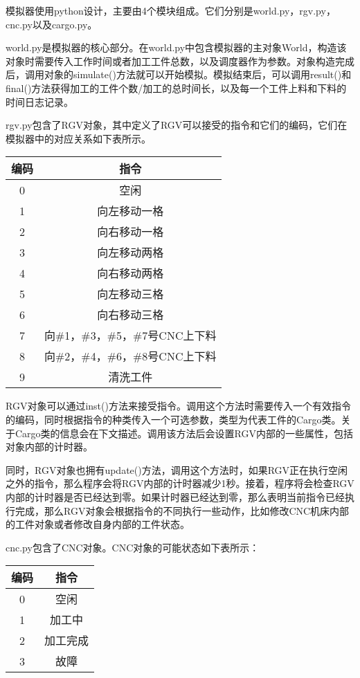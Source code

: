 \documentclass{cumcmthesis}
\begin{document}
模拟器使用python设计，主要由4个模块组成。它们分别是world.py，rgv.py，cnc.py以及cargo.py。

world.py是模拟器的核心部分。在world.py中包含模拟器的主对象World，构造该对象时需要传入工作时间或者加工工件总数，以及调度器作为参数。对象构造完成后，调用对象的simulate()方法就可以开始模拟。模拟结束后，可以调用result()和final()方法获得加工的工件个数/加工的总时间长，以及每一个工件上料和下料的时间日志记录。

rgv.py包含了RGV对象，其中定义了RGV可以接受的指令和它们的编码，它们在模拟器中的对应关系如下表所示。

\begin{tabular}{c|c}
	\hline
	编码 & 指令 \\
	\hline
	0 & 空闲 \\
	1 & 向左移动一格\\
	2 & 向右移动一格\\
	3 & 向左移动两格\\
	4 & 向右移动两格\\
	5 & 向左移动三格\\
	6 & 向右移动三格\\
	7 & 向\#1，\#3，\#5，\#7号CNC上下料\\
	8 & 向\#2，\#4，\#6，\#8号CNC上下料\\
	9 & 清洗工件\\
	\hline
\end{tabular}

RGV对象可以通过inst()方法来接受指令。调用这个方法时需要传入一个有效指令的编码，同时根据指令的种类传入一个可选参数，类型为代表工件的Cargo类。关于Cargo类的信息会在下文描述。调用该方法后会设置RGV内部的一些属性，包括对象内部的计时器。

同时，RGV对象也拥有update()方法，调用这个方法时，如果RGV正在执行空闲之外的指令，那么程序会将RGV内部的计时器减少1秒。接着，程序将会检查RGV内部的计时器是否已经达到零。如果计时器已经达到零，那么表明当前指令已经执行完成，那么RGV对象会根据指令的不同执行一些动作，比如修改CNC机床内部的工件对象或者修改自身内部的工件状态。

cnc.py包含了CNC对象。CNC对象的可能状态如下表所示：

\begin{tabular}{c|c}
	\hline
	编码 & 指令 \\
	\hline
	0 & 空闲 \\
	1 & 加工中\\
	2 & 加工完成\\
	3 & 故障\\
	\hline
\end{tabular}
\end{document}
